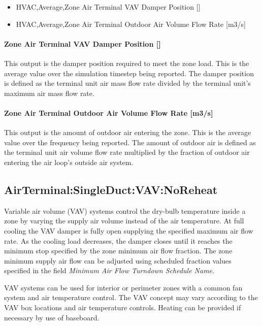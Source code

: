 \begin{itemize}
\item
  HVAC,Average,Zone Air Terminal VAV Damper Position {[]}
\item
  HVAC,Average,Zone Air Terminal Outdoor Air Volume Flow Rate {[}m3/s{]}
\end{itemize}

\paragraph{Zone Air Terminal VAV Damper Position {[]}}\label{zone-air-terminal-vav-damper-position-2}

This output is the damper position required to meet the zone load. This is the average value over the simulation timestep being reported. The damper position is defined as the terminal unit air mass flow rate divided by the terminal unit's maximum air mass flow rate.

\paragraph{Zone Air Terminal Outdoor Air Volume Flow Rate {[}m3/s{]}}

This output is the amount of outdoor air entering the zone. This is the average value over the frequency being reported. The amount of outdoor air is defined as the terminal unit air volume flow rate multiplied by the fraction of outdoor air entering the air loop's outside air system.

\subsection{AirTerminal:SingleDuct:VAV:NoReheat}\label{airterminalsingleductvavnoreheat}

Variable air volume (VAV) systems control the dry-bulb temperature inside a zone by varying the supply air volume instead of the air temperature. At full cooling the VAV damper is fully open supplying the specified maximum air flow rate. As the cooling load decreases, the damper closes until it reaches the minimum stop specified by the zone minimum air flow fraction. The zone minimum supply air flow can be adjusted using scheduled fraction values specified in the field \textit{Minimum Air Flow Turndown Schedule Name}.

VAV systems can be used for interior or perimeter zones with a common fan system and air temperature control. The VAV concept may vary according to the VAV box locations and air temperature controls. Heating can be provided if necessary by use of baseboard.

